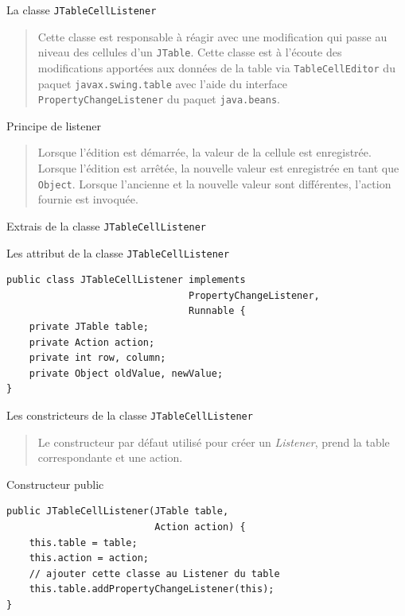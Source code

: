 \documentclass[captions=tableheading]{beamer}
\begin{document}
\begin{frame}[fragile,label={sec:org460606b}]{La classe \texttt{JTableCellListener}}
 \begin{quote}
Cette classe est responsable à réagir avec une modification qui passe au niveau des cellules d'un \texttt{JTable}. Cette classe est à l'écoute des modifications apportées aux données de la table via \texttt{TableCellEditor} du paquet \texttt{javax.swing.table} avec l'aide du interface \texttt{PropertyChangeListener} du paquet \texttt{java.beans}.
\end{quote}
\pause

\begin{block}{Principe de listener}
\begin{quote}
Lorsque l'édition est démarrée, la valeur de la cellule est enregistrée. Lorsque l'édition est arrêtée, la nouvelle valeur est enregistrée en tant que \texttt{Object}. Lorsque l'ancienne et la nouvelle valeur sont différentes, l'action fournie est invoquée.
\end{quote}
\end{block}
\end{frame}
\begin{frame}[fragile,label={sec:orge76674b}]{Extrais de la classe \texttt{JTableCellListener}}
 \begin{block}{Les attribut de la classe \texttt{JTableCellListener}}
\begin{verbatim}
public class JTableCellListener implements
                                PropertyChangeListener,
                                Runnable {
    private JTable table;
    private Action action;
    private int row, column;
    private Object oldValue, newValue;
}
\end{verbatim}
\end{block}
\end{frame}

\begin{frame}[fragile,label={sec:org8ca3da3}]{Les constricteurs de la classe \texttt{JTableCellListener}}
 \begin{quote}
Le constructeur par défaut utilisé pour créer un \emph{Listener}, prend la table correspondante et une action.
\end{quote}

\begin{block}{Constructeur public}
\begin{verbatim}
public JTableCellListener(JTable table,
                          Action action) {
    this.table = table;
    this.action = action;
    // ajouter cette classe au Listener du table
    this.table.addPropertyChangeListener(this);
}
\end{verbatim}
\end{block}
\end{frame}
\end{document}
